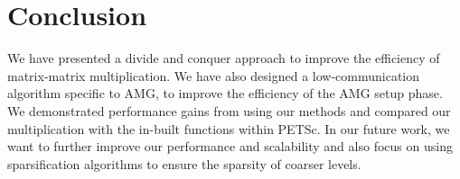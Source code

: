 \section{Conclusion}
\label{sec:conc}

We have presented a divide and conquer approach to improve the efficiency of matrix-matrix multiplication. We have also designed a low-communication algorithm specific to AMG, to improve the efficiency of the AMG setup phase. We demonstrated performance gains from using our methods and compared our multiplication with the in-built functions within PETSc. In our future work, we want to further improve our performance and scalability and also focus on using sparsification algorithms to ensure the sparsity of coarser levels. 
